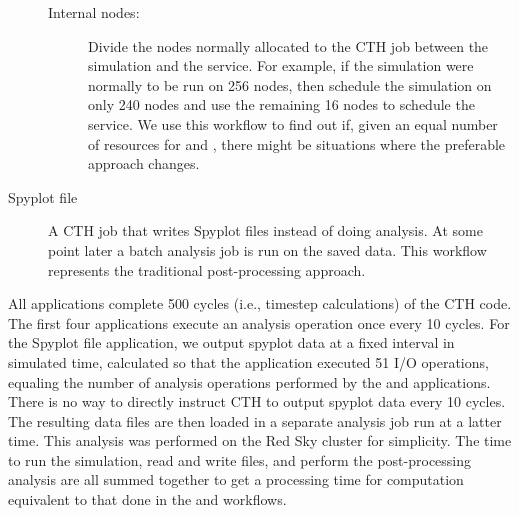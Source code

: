 \begin{description}
\begin{description}
  \item[Internal nodes:] Divide the nodes normally allocated to the CTH job
    between the simulation and the \vda service.  For example, if the
    simulation were normally to be run on 256 nodes, then schedule the
    simulation on only 240 nodes and use the remaining 16 nodes to schedule
    the \vda service.  We use this workflow to find out if, given an equal
    number of resources for \insitu and \intransit, there might be
    situations where the preferable approach changes.
    
  \end{description}

\item [Spyplot file] A CTH job that writes Spyplot files instead of doing
  analysis.  At some point later a batch analysis job is run on the saved
  data.  This workflow represents the traditional post-processing approach.
\end{description}

All applications complete 500 cycles (i.e., timestep calculations) of the
CTH code. The first four applications execute an analysis operation once
every 10 cycles.  For the Spyplot file application, we output spyplot data
at a fixed interval in simulated time, calculated so that the application
executed 51 I/O operations, equaling the number of analysis operations
performed by the \insitu and \intransit applications.  There is no way to
directly instruct CTH to output spyplot data every 10 cycles.  The
resulting data files are then loaded in a separate analysis job run at a
latter time.  This analysis was performed on the Red Sky cluster for
simplicity.    The time to run the simulation, read
and write files, and perform the post-processing analysis are all summed
together to get a processing time for computation equivalent to that done
in the \insitu and \intransit workflows.

